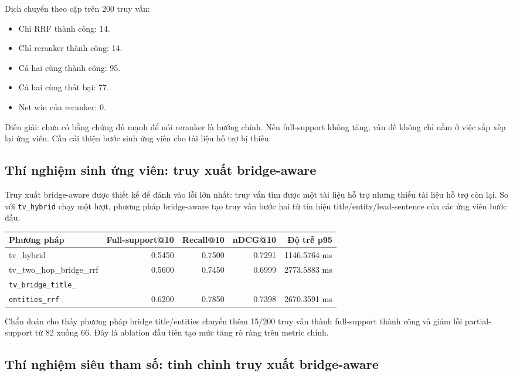 \documentclass[11pt,a4paper]{article}
\newcommand{\method}[1]{\texttt{#1}}
\newcommand{\bridgecell}{\texttt{tv\_bridge\_title\_}\\\texttt{entities\_rrf}}
\begin{document}
Dịch chuyển theo cặp trên 200 truy vấn:

\begin{itemize}
  \item Chỉ RRF thành công: 14.
  \item Chỉ reranker thành công: 14.
  \item Cả hai cùng thành công: 95.
  \item Cả hai cùng thất bại: 77.
  \item Net win của reranker: 0.
\end{itemize}

Diễn giải: chưa có bằng chứng đủ mạnh để nói reranker là hướng chính. Nếu full-support không
tăng, vấn đề không chỉ nằm ở việc sắp xếp lại ứng viên. Cần cải thiện bước sinh ứng viên cho
tài liệu hỗ trợ bị thiếu.

\subsection{Thí nghiệm sinh ứng viên: truy xuất bridge-aware}

Truy xuất bridge-aware được thiết kế để đánh vào lỗi lớn nhất: truy vấn tìm được một tài liệu hỗ trợ
nhưng thiếu tài liệu hỗ trợ còn lại. So với \method{tv\_hybrid} chạy một lượt, phương pháp bridge-aware tạo
truy vấn bước hai từ tín hiệu title/entity/lead-sentence của các ứng viên bước đầu.

\begin{tabularx}{\textwidth}{>{\ttfamily\raggedright\arraybackslash}p{} r r r r}
\toprule
Phương pháp & Full-support@10 & Recall@10 & nDCG@10 & Độ trễ p95 \\
\midrule
tv\_hybrid & 0.5450 & 0.7500 & 0.7291 & 1146.5764 ms \\
tv\_two\_hop\_bridge\_rrf & 0.5600 & 0.7450 & 0.6999 & 2773.5883 ms \\
\bridgecell & 0.6200 & 0.7850 & 0.7398 & 2670.3591 ms \\
\bottomrule
\end{tabularx}

Chẩn đoán cho thấy phương pháp bridge title/entities chuyển thêm 15/200 truy vấn thành full-support
thành công và giảm lỗi partial-support từ 82 xuống 66. Đây là ablation đầu tiên tạo mức tăng rõ ràng
trên metric chính.

\subsection{Thí nghiệm siêu tham số: tinh chỉnh truy xuất bridge-aware}
\end{document}
